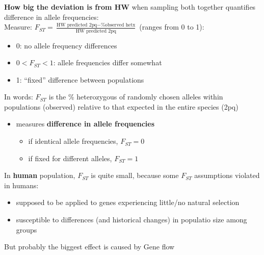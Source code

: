 \documentclass{scrartcl}
\begin{document}
{\bf How big the deviation is from HW } when sampling both together quantifies difference in allele frequencies:\\
Measure: $F_{ST} = \frac{\text{HW predicted 2pq} - \text{\% observed hetx}}{\text{HW predicted 2pq}}$ (ranges from 0 to 1):
\begin{itemize}
\item 0: no allele frequency differences
\item $0 < F_{ST} < 1$: allele frequencies differ somewhat
\item 1: ``fixed'' difference between populations
\end{itemize}
In words: $F_{ST}$ is the \% heterozygous of randomly chosen alleles within populations (observed) relative to that expected in the entire species (2pq)\\
\begin{itemize}
\item measures {\bf difference in allele frequencies }
  \begin{itemize}
  \item if identical allele frequencies, $F_{ST} = 0$
  \item if fixed for different alleles, $F_{ST} = 1$
  \end{itemize}
\end{itemize}
In {\bf human } population, $F_{ST}$ is quite small, because some $F_{ST}$ assumptions violated in humans:
\begin{itemize}
\item supposed to be applied to genes experiencing little/no natural selection
\item susceptible to differences (and historical changes) in populatio size among groups
\end{itemize}
But probably the biggest effect is caused by Gene flow

\end{document}
